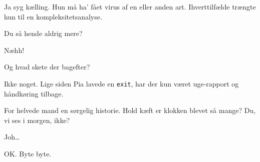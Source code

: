 \documentclass[a4paper,11pt]{article}
\begin{document}
\begin{sketch}
     Ja syg kælling. Hun må ha' fået virus af en eller anden art. Ihverttilfælde trængte hun til en kompleksitetsanalyse.

     Du så hende aldrig mere?

     Næhh!

     Og hvad skete der bagefter?

     Ikke noget. Lige siden Pia lavede en \texttt{exit}, har der kun været uge-rapport og håndkøring tilbage.

     For helvede mand en sørgelig historie. Hold kæft er klokken blevet så mange? Du, vi ses i morgen, ikke?
    
     Joh\ldots

     OK. Byte byte.
\end{sketch}
\end{document}
